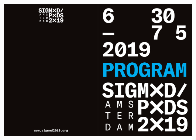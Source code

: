 \documentclass[10pt,paper=a6,twoside=true,BCOR=10mm,DIV=calc]{scrbook}
\begin{document}

\thispagestyle{empty}
~\newpage

\thispagestyle{empty}
\hspace*{-4mm}\includegraphics[width=100mm]{images/back.pdf}
\end{document}
